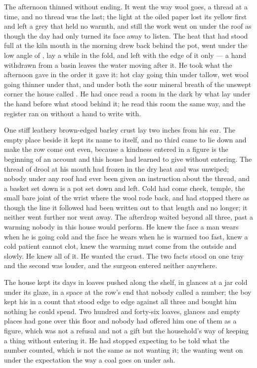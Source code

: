 The afternoon thinned without ending. It went the way wool goes, a thread at a time, and no thread was the last; the light at the oiled paper lost its yellow first and left a grey that held no warmth, and still the work went on under the roof as though the day had only turned its face away to listen. The heat that had stood full at the kiln mouth in the morning drew back behind the pot, went under the low angle of , lay a while in the fold, and left  with the edge of it only --- a hand withdrawn from a basin leaves the water moving after it. He took what the afternoon gave in the order it gave it: hot clay going thin under tallow, wet wool going thinner under that, and under both the sour mineral breath of the unswept corner the house called . He had once read a room in the dark by what lay under the hand before what stood behind it; he read this room the same way, and the register ran on without a hand to write with.

One stiff leathery brown-edged barley crust lay two inches from his ear. The empty place beside it kept its name to itself, and no third came to lie down and make the row come out even, because a kindness entered in a figure is the beginning of an account and this house had learned to give without entering. The thread of drool at his mouth had frozen in the dry heat and was unwiped; nobody under any roof had ever been given an instruction about the thread, and a basket set down is a pot set down and left. Cold had come cheek, temple, the small bare joint of the wrist where the wool rode back, and had stopped there as though the line it followed had been written out to that length and no longer; it neither went further nor went away. The afterdrop waited beyond all three, past a warming nobody in this house would perform. He knew the face a man wears when he is going cold and the face he wears when he is warmed too fast, knew a cold patient cannot clot, knew the warming must come from the outside and slowly. He knew all of it. He wanted the crust. The two facts stood on one tray and the second was louder, and the surgeon entered neither anywhere.

The house kept its days in loaves pushed along the shelf, in glances at a jar cold under its glaze, in a space at the row's end that nobody called a number; the boy kept his in a count that stood edge to edge against all three and bought him nothing he could spend. Two hundred and forty-six loaves, glances and empty places had gone over this floor and nobody had offered him one of them as a figure, which was not a refusal and not a gift but the household's way of keeping a thing without entering it. He had stopped expecting to be told what the number counted, which is not the same as not wanting it; the wanting went on under the expectation the way a coal goes on under ash.

